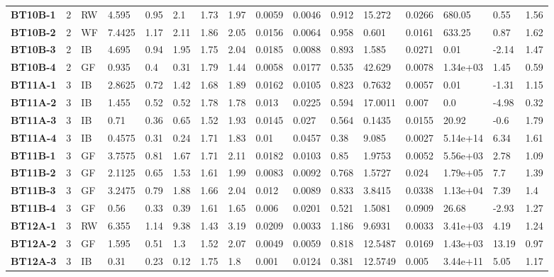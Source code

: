 \begin{table}
{\begin{tabular}{l|c|l|l|l|l|l|l|l|l|l|l|l|l|l|l}
    \hline
    \bfseries BT10B-1 & 2 & RW & 4.595 & 0.95 & 2.1 & 1.73 & 1.97 & 0.0059 & 0.0046 & 0.912 & 15.272 & 0.0266 & 680.05 & 0.55 & 1.56 \\
    \bfseries BT10B-2 & 2 & WF & 7.4425 & 1.17 & 2.11 & 1.86 & 2.05 & 0.0156 & 0.0064 & 0.958 & 0.601 & 0.0161 & 633.25 & 0.87 & 1.62 \\
    \bfseries BT10B-3 & 2 & IB & 4.695 & 0.94 & 1.95 & 1.75 & 2.04 & 0.0185 & 0.0088 & 0.893 & 1.585 & 0.0271 & 0.01 & -2.14 & 1.47 \\
    \bfseries BT10B-4 & 2 & GF & 0.935 & 0.4 & 0.31 & 1.79 & 1.44 & 0.0058 & 0.0177 & 0.535 & 42.629 & 0.0078 & 1.34e+03 & 1.45 & 0.59 \\
    \hline
    \bfseries BT11A-1 & 3 & IB & 2.8625 & 0.72 & 1.42 & 1.68 & 1.89 & 0.0162 & 0.0105 & 0.823 & 0.7632 & 0.0057 & 0.01 & -1.31 & 1.15 \\
    \bfseries BT11A-2 & 3 & IB & 1.455 & 0.52 & 0.52 & 1.78 & 1.78 & 0.013 & 0.0225 & 0.594 & 17.0011 & 0.007 & 0.0 & -4.98 & 0.32 \\
    \bfseries BT11A-3 & 3 & IB & 0.71 & 0.36 & 0.65 & 1.52 & 1.93 & 0.0145 & 0.027 & 0.564 & 0.1435 & 0.0155 & 20.92 & -0.6 & 1.79 \\
    \bfseries BT11A-4 & 3 & IB & 0.4575 & 0.31 & 0.24 & 1.71 & 1.83 & 0.01 & 0.0457 & 0.38 & 9.085 & 0.0027 & 5.14e+14 & 6.34 & 1.61 \\
    \hline
    \bfseries BT11B-1 & 3 & GF & 3.7575 & 0.81 & 1.67 & 1.71 & 2.11 & 0.0182 & 0.0103 & 0.85 & 1.9753 & 0.0052 & 5.56e+03 & 2.78 & 1.09 \\
    \bfseries BT11B-2 & 3 & GF & 2.1125 & 0.65 & 1.53 & 1.61 & 1.99 & 0.0083 & 0.0092 & 0.768 & 1.5727 & 0.024 & 1.79e+05 & 7.7 & 1.39 \\
    \bfseries BT11B-3 & 3 & GF & 3.2475 & 0.79 & 1.88 & 1.66 & 2.04 & 0.012 & 0.0089 & 0.833 & 3.8415 & 0.0338 & 1.13e+04 & 7.39 & 1.4 \\
    \bfseries BT11B-4 & 3 & GF & 0.56 & 0.33 & 0.39 & 1.61 & 1.65 & 0.006 & 0.0201 & 0.521 & 1.5081 & 0.0909 & 26.68 & -2.93 & 1.27 \\
    \hline
    \bfseries BT12A-1 & 3 & RW & 6.355 & 1.14 & 9.38 & 1.43 & 3.19 & 0.0209 & 0.0033 & 1.186 & 9.6931 & 0.0033 & 3.41e+03 & 4.19 & 1.24 \\
    \bfseries BT12A-2 & 3 & GF & 1.595 & 0.51 & 1.3 & 1.52 & 2.07 & 0.0049 & 0.0059 & 0.818 & 12.5487 & 0.0169 & 1.43e+03 & 13.19 & 0.97 \\
    \bfseries BT12A-3 & 3 & IB & 0.31 & 0.23 & 0.12 & 1.75 & 1.8 & 0.001 & 0.0124 & 0.381 & 12.5749 & 0.005 & 3.44e+11 & 5.05 & 1.17 \\

\end{tabular}}
\end{table}
